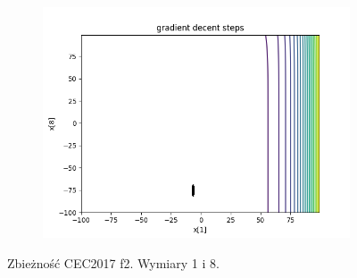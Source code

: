 \begin{figure}[h!]
\begin{subfigure}[b]{0.45\linewidth}
			\includegraphics[width=\linewidth]{photos/f2_3_0.png}
		\end{subfigure}
		\caption{Zbieżność CEC2017 f2. Wymiary 1 i 8.}
	\end{figure}
	\newpage
